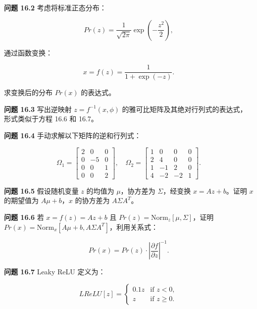 \documentclass[lang=cn,newtx,10pt,scheme=chinese]{elegantbook}
\begin{document}
\textbf{问题 16.2} 考虑将标准正态分布：

\begin{equation}
Pr(z) = \frac{1}{\sqrt{2\pi}} \exp\left(-\frac{z^2}{2}\right), 
\end{equation}

通过函数变换：

\begin{equation}
x = f(z) = \frac{1}{1 + \exp(-z)}. 
\end{equation}

求变换后的分布 \(Pr(x)\) 的表达式。

\textbf{问题 16.3} 写出逆映射 \(z = f^{-1}(x, \phi)\) 的雅可比矩阵及其绝对行列式的表达式，形式类似于方程 16.6 和 16.7。

\textbf{问题 16.4} 手动求解以下矩阵的逆和行列式：

\begin{equation}
\Omega_1 = \begin{bmatrix}
2 & 0 & 0 \\
0 & -5 & 0 \\
0 & 0 & 1 \\
0 & 0 & 2
\end{bmatrix}, \quad
\Omega_2 = \begin{bmatrix}
1 & 0 & 0 & 0\\
2 & 4 & 0 & 0\\
1 & -1 & 2 & 0\\
4 & -2 & -2 & 1
\end{bmatrix}. 
\end{equation}

\textbf{问题 16.5} 假设随机变量 \(z\) 的均值为 \(\mu\)，协方差为 \(\Sigma\)，经变换 \(x = Az + b\)。证明 \(x\) 的期望值为 \(A\mu + b\)，\(x\) 的协方差为 \(A\Sigma A^T\)。

\textbf{问题 16.6} 若 \(x = f(z) = Az + b\) 且 \(Pr(z) = \text{Norm}_z[\mu, \Sigma]\)，证明 \(Pr(x) = \text{Norm}_x[A\mu + b, A\Sigma A^T]\)，利用关系式：

\begin{equation}
Pr(x) = Pr(z) \cdot \left| \frac{\partial f}{\partial z} \right|^{-1}. 
\end{equation}

\textbf{问题 16.7} Leaky ReLU 定义为：

\begin{equation}
LReLU[z] = \begin{cases}
0.1z & \text{if } z < 0, \\
z & \text{if } z \geq 0.
\end{cases} 
\end{equation}
\end{document}
